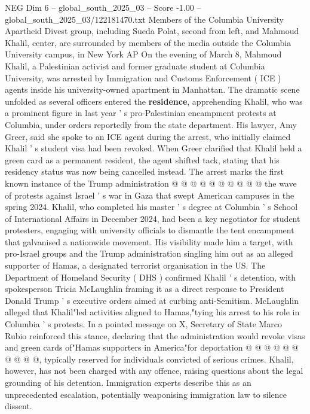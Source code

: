 \begin{textsample}{NEG Dim 6 – global\_south\_2025\_03 – Score -1.00 – global\_south\_2025\_03/122181470.txt}  \label{ex:f6_neg_137}
Members of the Columbia University Apartheid Divest group, including Sueda Polat, second from left, and Mahmoud Khalil, center, are surrounded by members of the media outside the Columbia University campus, in New York AP On the evening of March 8, Mahmoud Khalil, a Palestinian activist and former graduate student at Columbia University, was arrested by Immigration and Customs Enforcement ( ICE ) agents inside his university-owned apartment in Manhattan.
The dramatic scene unfolded as several officers entered the \textbf{residence}, apprehending Khalil, who was a prominent figure in last year ' s pro-Palestinian encampment protests at Columbia, under orders reportedly from the state department.
His lawyer, Amy Greer, said she spoke to an ICE agent during the arrest, who initially claimed Khalil ' s student visa had been revoked.
When Greer clarified that Khalil held a green card as a permanent resident, the agent shifted tack, stating that his residency status was now being cancelled instead.
The arrest marks the first known instance of the Trump administration @ @ @ @ @ @ @ @ @ @ the wave of protests against Israel ' s war in Gaza that swept American campuses in the spring 2024.
Khalil, who completed his master ' s degree at Columbia ' s School of International Affairs in December 2024, had been a key negotiator for student protesters, engaging with university officials to dismantle the tent encampment that galvanised a nationwide movement.
His visibility made him a target, with pro-Israel groups and the Trump administration singling him out as an alleged supporter of Hamas, a designated terrorist organisation in the US.
The Department of Homeland Security ( DHS ) confirmed Khalil ' s detention, with spokesperson Tricia McLaughlin framing it as a direct response to President Donald Trump ' s executive orders aimed at curbing anti-Semitism.
McLaughlin alleged that Khalil"led activities aligned to Hamas,"tying his arrest to his role in Columbia ' s protests.
In a pointed message on X, Secretary of State Marco Rubio reinforced this stance, declaring that the administration would revoke visas and green cards of"Hamas supporters in America"for deportation @ @ @ @ @ @ @ @ @ @, typically reserved for individuals convicted of serious crimes.
Khalil, however, has not been charged with any offence, raising questions about the legal grounding of his detention.
Immigration experts describe this as an unprecedented escalation, potentially weaponising immigration law to silence dissent.

\end{textsample}
